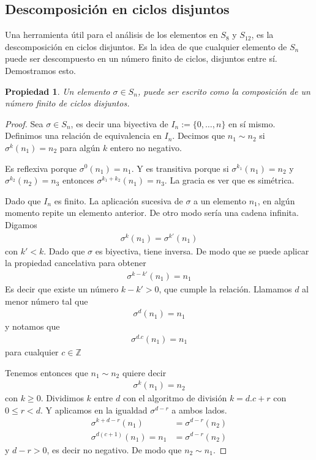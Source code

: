 \documentclass{article}
\newtheorem{propiedad}{Propiedad}[section]
\theoremstyle{definition}
\newcommand{\Z}{\mathbb{Z}}
\begin{document}
\subsection{Descomposición en ciclos disjuntos}
Una herramienta útil para el análisis de los elementos en $S_{8}$ y $S_{12}$, es la descomposición en ciclos disjuntos. Es la idea de que cualquier elemento de $S_n$ puede ser descompuesto en un número finito de ciclos, disjuntos entre sí. Demostramos esto.
\begin{propiedad}
    Un elemento $\sigma\in S_n$, puede ser escrito como la composición de un número finito de ciclos disjuntos.
\end{propiedad}
\begin{proof}
    Sea $\sigma\in S_n$, es decir una biyectiva de $I_n:=\{0,\dots,n\}$ en sí mismo. Definimos una relación de equivalencia en $I_n$. Decimos que $n_1\sim n_2$ si $\sigma^k(n_1)=n_2$ para algún $k$ entero no negativo.

    Es reflexiva porque $\sigma ^0(n_1)=n_1$. Y es transitiva porque si $\sigma^{k_1}(n_1)=n_2$ y $\sigma^{k_2}(n_2)= n_3$ entonces $\sigma^{k_1+k_2}(n_1)=n_3$. La gracia es ver que es simétrica.

    Dado que $I_n$ es finito. La aplicación sucesiva de $\sigma$ a un elemento $n_1$, en algún momento repite un elemento anterior. De otro modo sería una cadena infinita. Digamos
    \begin{align*}
        \sigma^{k}(n_1)=\sigma^{k'}(n_1)
    \end{align*} con $k'< k$. Dado que $\sigma$ es biyectiva, tiene inversa. De modo que se puede aplicar la propiedad cancelativa para obtener
    \begin{align*}
        \sigma^{k-k'}(n_1)=n_1
    \end{align*}
    Es decir que existe un número $k-k'> 0$, que cumple la relación. Llamamos $d$ al menor número tal que
    \begin{align*}
        \sigma^d(n_1)=n_1
    \end{align*}
    y notamos que
    \begin{align*}
        \sigma^{d.c}(n_1)=n_1
    \end{align*}
    para cualquier $c\in \Z$

    Tenemos entonces que $n_1\sim n_2$ quiere decir
    \begin{align*}
        \sigma^{k}(n_1)=n_2
    \end{align*}
    con $k\geq 0$. Dividimos $k$ entre $d$ con el algoritmo de división $k=d.c+r$ con $0\leq r<d$. Y aplicamos en la igualdad $\sigma^{d-r}$ a ambos lados.
    \begin{align*}
        \sigma^{k+d-r}(n_1)      & =\sigma^{d-r}(n_2) \\
        \sigma^{d(c+1)}(n_1)=n_1 & =\sigma^{d-r}(n_2)
    \end{align*}
    y $d-r>0$, es decir no negativo. De modo que $n_2\sim n_1$.


\end{proof}
\end{document}

